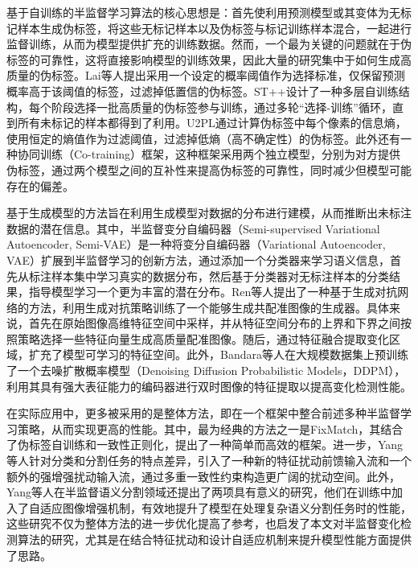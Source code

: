 \documentclass[lang=chs, degree=master, blindreview=false, adobe=false]{yanputhesis}
\begin{document}
基于自训练的半监督学习算法的核心思想是：首先使利用预测模型或其变体为无标记样本生成伪标签，将这些无标记样本以及伪标签与标记训练样本混合，一起进行监督训练，从而为模型提供扩充的训练数据。然而，一个最为关键的问题就在于伪标签的可靠性，这将直接影响模型的训练效果，因此大量的研究集中于如何生成高质量的伪标签。Lai等人\cite{Lai2021CAC}提出采用一个设定的概率阈值作为选择标准，仅保留预测概率高于该阈值的标签，过滤掉低置信的伪标签。ST++\cite{yang2022st++}设计了一种多层自训练结构，每个阶段选择一批高质量的伪标签参与训练，通过多轮“选择-训练”循环，直到所有未标记的样本都得到了利用。U2PL\cite{wang2022u2pl}通过计算伪标签中每个像素的信息熵，使用恒定的熵值作为过滤阈值，过滤掉低熵（高不确定性）的伪标签。此外还有一种协同训练（Co-training）框架\cite{co-training}，这种框架采用两个独立模型，分别为对方提供伪标签，通过两个模型之间的互补性来提高伪标签的可靠性，同时减少但模型可能存在的偏差。

基于生成模型的方法旨在利用生成模型对数据的分布进行建模，从而推断出未标注数据的潜在信息。其中，半监督变分自编码器\cite{semiVAE}（Semi-supervised Variational Autoencoder, Semi-VAE）是一种将变分自编码器（Variational Autoencoder, VAE）扩展到半监督学习的创新方法，通过添加一个分类器来学习语义信息，首先从标注样本集中学习真实的数据分布，然后基于分类器对无标注样本的分类结果，指导模型学习一个更为丰富的潜在分布。Ren等人\cite{gen_sample_TGRS21}提出了一种基于生成对抗网络的方法，利用生成对抗策略训练了一个能够生成共配准图像的生成器。具体来说，首先在原始图像高维特征空间中采样，并从特征空间分布的上界和下界之间按照策略选择一些特征向量生成高质量配准图像。随后，通过特征融合提取变化区域，扩充了模型可学习的特征空间。此外，Bandara等人\cite{bandara2022ddpm}在大规模数据集上预训练了一个去噪扩散概率模型（Denoising Diffusion Probabilistic Models，DDPM），利用其具有强大表征能力的编码器进行双时图像的特征提取以提高变化检测性能。

在实际应用中，更多被采用的是整体方法，即在一个框架中整合前述多种半监督学习策略，从而实现更高的性能。其中，最为经典的方法之一是FixMatch\cite{sohn2020fixmatch}，其结合了伪标签自训练和一致性正则化，提出了一种简单而高效的框架。进一步，Yang等人\cite{UniMatch}针对分类和分割任务的特点差异，引入了一种新的特征扰动前馈输入流和一个额外的强增强扰动输入流，通过多重一致性约束构造更广阔的扰动空间。此外，Yang等人在半监督语义分割领域还提出了两项具有意义的研究\cite{AugSeg}\cite{iMAS}，他们在训练中加入了自适应图像增强机制，有效地提升了模型在处理复杂语义分割任务时的性能，这些研究不仅为整体方法的进一步优化提高了参考，也启发了本文对半监督变化检测算法的研究，尤其是在结合特征扰动和设计自适应机制来提升模型性能方面提供了思路。
\end{document}
